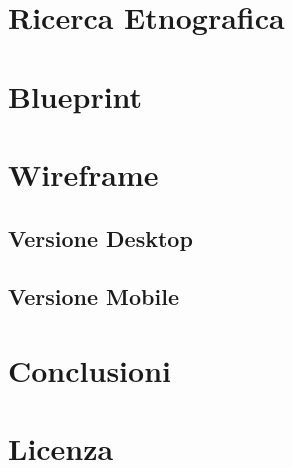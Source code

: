 \documentclass[12pt,a4paper]{report}
\begin{document}
\chapter{Ricerca Etnografica}
\chapter{Blueprint}
\chapter{Wireframe}
\section{Versione Desktop}
\section{Versione Mobile}
\chapter{Conclusioni}
\chapter{Licenza}
\end{document}

